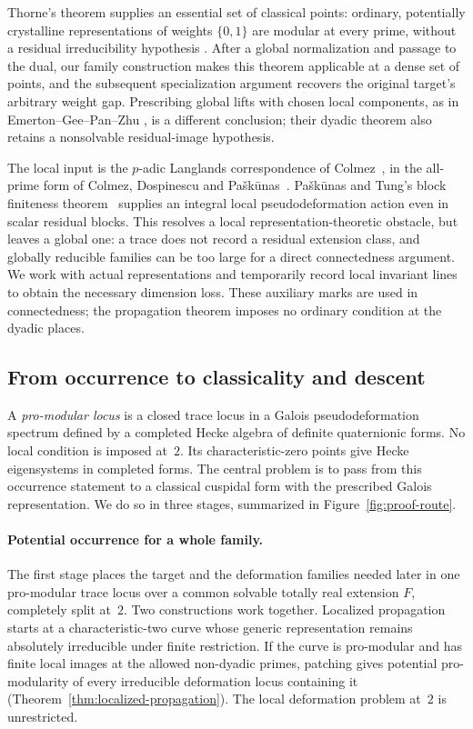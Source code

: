 Thorne's theorem supplies an essential set of classical points:
ordinary, potentially crystalline representations of weights
$\{0,1\}$ are modular at every prime, without a residual
irreducibility hypothesis \cite[Theorem~D]{Thorne2026}.
After a global normalization and passage to the dual, our family
construction makes this theorem applicable at a dense
set of points, and the subsequent specialization argument recovers
the original target's arbitrary weight gap. Prescribing global
lifts with chosen local components, as in Emerton--Gee--Pan--Zhu
\cite[Theorem~1.1.1]{EGPZ2026}, is a different conclusion;
their dyadic theorem also retains a nonsolvable residual-image
hypothesis.

The local input is the \(p\)-adic Langlands correspondence of
Colmez~\cite{Colmez2010}, in the all-prime form of Colmez, Dospinescu
and Pa\v{s}k\=unas~\cite{CDP2014}. Pa\v{s}k\=unas and Tung's block
finiteness theorem~\cite{PaskunasTung2021} supplies an integral local
pseudodeformation action even in scalar residual blocks. This resolves
a local representation-theoretic obstacle, but leaves a global one:
a trace does not record a residual extension class, and globally
reducible families can be too large for a direct connectedness argument.
We work with actual representations and temporarily record local
invariant lines to obtain the necessary dimension loss. These auxiliary
marks are used in connectedness; the propagation theorem imposes no
ordinary condition at the dyadic places.

\subsection{From occurrence to classicality and descent}

A \emph{pro-modular locus} is a closed trace locus in a Galois
pseudodeformation spectrum defined by a completed Hecke algebra of
definite quaternionic forms. No local condition is imposed at~\(2\).
Its characteristic-zero points give Hecke eigensystems in completed
forms. The central problem is to pass from this occurrence statement
to a classical cuspidal form with the prescribed Galois representation.
We do so in three stages, summarized in Figure~\ref{fig:proof-route}.

\paragraph{Potential occurrence for a whole family.}
The first stage places the target and the deformation families needed
later in one pro-modular trace locus over a common solvable totally
real extension \(F\), completely split at~\(2\). Two constructions
work together. Localized propagation starts at a characteristic-two
curve whose generic representation remains absolutely irreducible
under finite restriction. If the curve is pro-modular and has finite
local images at the allowed non-dyadic primes, patching gives
potential pro-modularity of every irreducible deformation locus
containing it (Theorem~\ref{thm:localized-propagation}). The local
deformation problem at~\(2\) is unrestricted.

